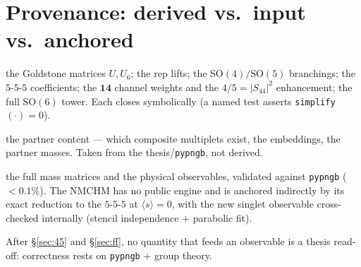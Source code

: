 \documentclass[11pt]{article}
\newcommand{\SO}[1]{\mathrm{SO}(#1)}
\newcommand{\code}[1]{\texttt{#1}}
\begin{document}
\section*{Provenance: derived vs.\ input vs.\ anchored}
\begin{description}[leftmargin=1.4em,style=nextline]
  \item[Derived (this document)] the Goldstone matrices $U,U_6$; the rep lifts; the $\SO4/\SO5$
    branchings; the $5$-$5$-$5$ coefficients; the $\mathbf{14}$ channel weights and the
    $4/5=|S_{44}|^2$ enhancement; the full $\SO6$ tower. Each closes symbolically (a named test
    asserts \texttt{simplify}$(\cdot)=0$).
  \item[Input (model structure)] the partner content --- which composite multiplets exist, the
    embeddings, the partner masses. Taken from the thesis/\code{pypngb}, not derived.
  \item[Anchored] the full mass matrices and the physical observables, validated against
    \code{pypngb} ($<0.1\%$). The NMCHM has no public engine and is anchored indirectly by its
    exact reduction to the $5$-$5$-$5$ at $\langle s\rangle=0$, with the new singlet observable
    cross-checked internally (stencil independence + parabolic fit).
\end{description}
After \S\ref{sec:45} and \S\ref{sec:ff}, no quantity that feeds an observable is a thesis
read-off: correctness rests on \code{pypngb} $+$ group theory.
\end{document}
